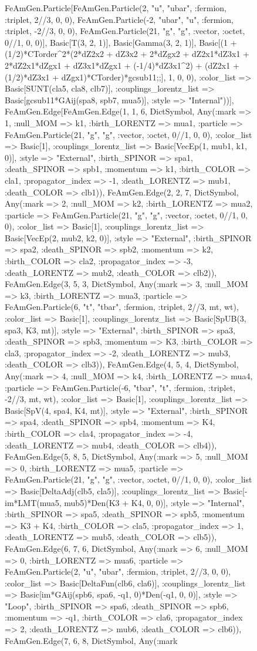 \documentclass{revtex4}
\begin{document}
\begin{figure}[!htb]
\begin{center}
{FeAmGen.Particle[FeAmGen.Particle(2, "u", "ubar", :fermion, :triplet, 2//3, 0, 0), FeAmGen.Particle(-2, "ubar", "u", :fermion, :triplet, -2//3, 0, 0), FeAmGen.Particle(21, "g", "g", :vector, :octet, 0//1, 0, 0)], Basic[T(3, 2, 1)], Basic[Gamma(3, 2, 1)], Basic[(1 + (1/2)*CTorder^2*(2*dZ2x2 + dZ3x2 + 2*dZgx2 + dZ2x1*dZ3x1 + 2*dZ2x1*dZgx1 + dZ3x1*dZgx1 + (-1/4)*dZ3x1^2) + (dZ2x1 + (1/2)*dZ3x1 + dZgx1)*CTorder)*gcsub11;;], 1, 0, 0), :color_list => Basic[SUNT(cla5, cla8, clb7)], :couplings_lorentz_list => Basic[gcsub11*GAij(spa8, spb7, mua5)], :style => "Internal"))], FeAmGen.Edge[FeAmGen.Edge(1, 1, 6, Dict{Symbol, Any}(:mark => 1, :null_MOM => k1, :birth_LORENTZ => mua1, :particle => FeAmGen.Particle(21, "g", "g", :vector, :octet, 0//1, 0, 0), :color_list => Basic[1], :couplings_lorentz_list => Basic[VecEp(1, mub1, k1, 0)], :style => "External", :birth_SPINOR => spa1, :death_SPINOR => spb1, :momentum => k1, :birth_COLOR => cla1, :propagator_index => -1, :death_LORENTZ => mub1, :death_COLOR => clb1)), FeAmGen.Edge(2, 2, 7, Dict{Symbol, Any}(:mark => 2, :null_MOM => k2, :birth_LORENTZ => mua2, :particle => FeAmGen.Particle(21, "g", "g", :vector, :octet, 0//1, 0, 0), :color_list => Basic[1], :couplings_lorentz_list => Basic[VecEp(2, mub2, k2, 0)], :style => "External", :birth_SPINOR => spa2, :death_SPINOR => spb2, :momentum => k2, :birth_COLOR => cla2, :propagator_index => -3, :death_LORENTZ => mub2, :death_COLOR => clb2)), FeAmGen.Edge(3, 5, 3, Dict{Symbol, Any}(:mark => 3, :null_MOM => k3, :birth_LORENTZ => mua3, :particle => FeAmGen.Particle(6, "t", "tbar", :fermion, :triplet, 2//3, mt, wt), :color_list => Basic[1], :couplings_lorentz_list => Basic[SpUB(3, spa3, K3, mt)], :style => "External", :birth_SPINOR => spa3, :death_SPINOR => spb3, :momentum => K3, :birth_COLOR => cla3, :propagator_index => -2, :death_LORENTZ => mub3, :death_COLOR => clb3)), FeAmGen.Edge(4, 5, 4, Dict{Symbol, Any}(:mark => 4, :null_MOM => k4, :birth_LORENTZ => mua4, :particle => FeAmGen.Particle(-6, "tbar", "t", :fermion, :triplet, -2//3, mt, wt), :color_list => Basic[1], :couplings_lorentz_list => Basic[SpV(4, spa4, K4, mt)], :style => "External", :birth_SPINOR => spa4, :death_SPINOR => spb4, :momentum => K4, :birth_COLOR => cla4, :propagator_index => -4, :death_LORENTZ => mub4, :death_COLOR => clb4)), FeAmGen.Edge(5, 8, 5, Dict{Symbol, Any}(:mark => 5, :null_MOM => 0, :birth_LORENTZ => mua5, :particle => FeAmGen.Particle(21, "g", "g", :vector, :octet, 0//1, 0, 0), :color_list => Basic[DeltaAdj(clb5, cla5)], :couplings_lorentz_list => Basic[-im*LMT(mua5, mub5)*Den(K3 + K4, 0, 0)], :style => "Internal", :birth_SPINOR => spa5, :death_SPINOR => spb5, :momentum => K3 + K4, :birth_COLOR => cla5, :propagator_index => 1, :death_LORENTZ => mub5, :death_COLOR => clb5)), FeAmGen.Edge(6, 7, 6, Dict{Symbol, Any}(:mark => 6, :null_MOM => 0, :birth_LORENTZ => mua6, :particle => FeAmGen.Particle(2, "u", "ubar", :fermion, :triplet, 2//3, 0, 0), :color_list => Basic[DeltaFun(clb6, cla6)], :couplings_lorentz_list => Basic[im*GAij(spb6, spa6, -q1, 0)*Den(-q1, 0, 0)], :style => "Loop", :birth_SPINOR => spa6, :death_SPINOR => spb6, :momentum => -q1, :birth_COLOR => cla6, :propagator_index => 2, :death_LORENTZ => mub6, :death_COLOR => clb6)), FeAmGen.Edge(7, 6, 8, Dict{Symbol, Any}(:mark }
\end{center}
\end{figure}
\end{document}
